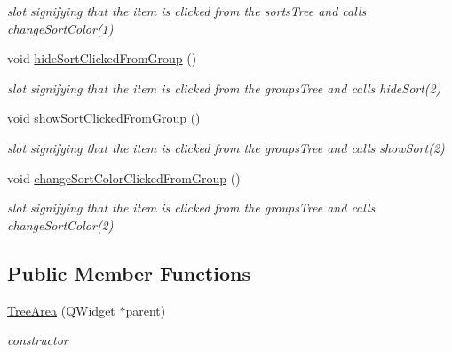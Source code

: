 \begin{DoxyCompactItemize}
\begin{DoxyCompactList}\small\item\em slot signifying that the item is clicked from the sorts\+Tree and calls change\+Sort\+Color(1) \end{DoxyCompactList}\item 
\hypertarget{classTreeArea_ab5c0a22f1ccceb2244cb31f320971938}{void \hyperlink{classTreeArea_ab5c0a22f1ccceb2244cb31f320971938}{hide\+Sort\+Clicked\+From\+Group} ()}\label{classTreeArea_ab5c0a22f1ccceb2244cb31f320971938}

\begin{DoxyCompactList}\small\item\em slot signifying that the item is clicked from the groups\+Tree and calls hide\+Sort(2) \end{DoxyCompactList}\item 
\hypertarget{classTreeArea_ada5feadb41bb5cb913e253433e935107}{void \hyperlink{classTreeArea_ada5feadb41bb5cb913e253433e935107}{show\+Sort\+Clicked\+From\+Group} ()}\label{classTreeArea_ada5feadb41bb5cb913e253433e935107}

\begin{DoxyCompactList}\small\item\em slot signifying that the item is clicked from the groups\+Tree and calls show\+Sort(2) \end{DoxyCompactList}\item 
\hypertarget{classTreeArea_a393f334d7da481b4233ceb9912791c99}{void \hyperlink{classTreeArea_a393f334d7da481b4233ceb9912791c99}{change\+Sort\+Color\+Clicked\+From\+Group} ()}\label{classTreeArea_a393f334d7da481b4233ceb9912791c99}

\begin{DoxyCompactList}\small\item\em slot signifying that the item is clicked from the groups\+Tree and calls change\+Sort\+Color(2) \end{DoxyCompactList}\end{DoxyCompactItemize}
\subsection*{Public Member Functions}
\begin{DoxyCompactItemize}
\item 
\hyperlink{classTreeArea_a83e789309721c85ff2f431c789c641ec}{Tree\+Area} (Q\+Widget $\ast$parent)
\begin{DoxyCompactList}\small\item\em constructor \end{DoxyCompactList}\end{DoxyCompactItemize}
